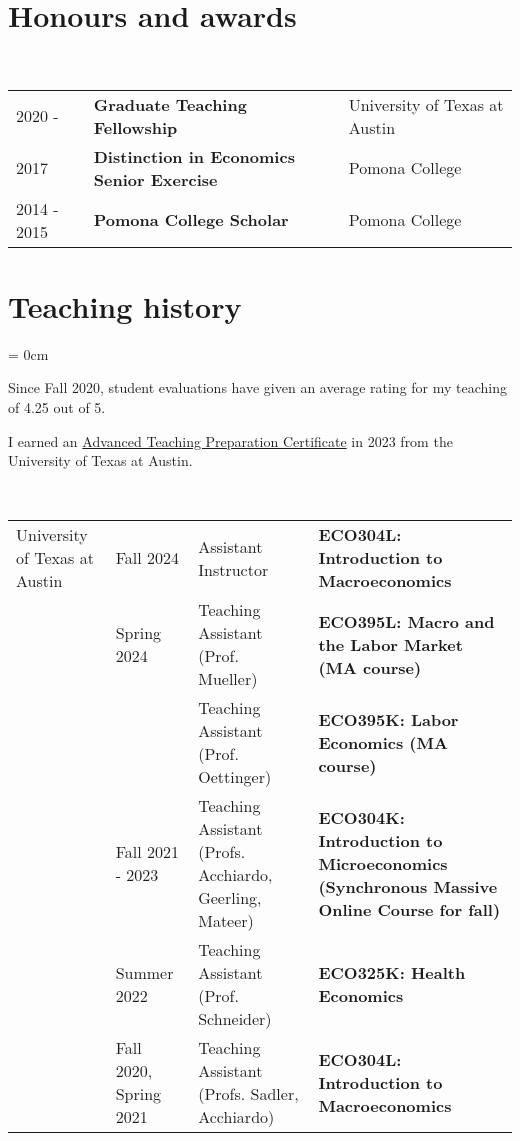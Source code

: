 \documentclass[a4paper, 10pt]{article}
\begin{document}
  \section{Honours and awards}
  ~\begin{tabular}{lll}
    2020 - & \textbf{Graduate Teaching Fellowship} & University of Texas at Austin\\
    2017 & \textbf{Distinction in Economics Senior Exercise} & Pomona College\\
    2014 - 2015 & \textbf{Pomona College Scholar} & Pomona College
  \end{tabular}
  \vspace*{0.25em}

  \section{Teaching history}\label{sec:teaching_history}
  \begin{compactitem}\parskip = 0cm
    \item Since Fall 2020, student evaluations have given an average rating for my teaching of 4.25 out of 5.
    \item I earned an \href{https://ctl.utexas.edu/teaching-preparation-series}{Advanced Teaching Preparation Certificate} in 2023 from the University of Texas at Austin.
  \end{compactitem}
  \vspace*{0.70em}
  ~\begin{tabular}{p{2.3cm} p{2.5cm} p{3.2cm} p{6.6cm}}
    University of \newline Texas at Austin & Fall 2024 & Assistant Instructor & \textbf{ECO304L: Introduction to \newline Macroeconomics}\\
    & Spring 2024 & Teaching Assistant \newline (Prof. Mueller) & \textbf{ECO395L: Macro and the Labor Market \newline (MA course)}\\
    & & Teaching Assistant \newline (Prof. Oettinger) & \textbf{ECO395K: Labor Economics (MA course)}\\
    & Fall 2021 - 2023 & Teaching Assistant \newline (Profs. Acchiardo, \newline Geerling, Mateer) & \textbf{ECO304K: Introduction to Microeconomics \newline (Synchronous Massive Online Course for \newline fall)}\\
    & Summer 2022 & Teaching Assistant \newline (Prof. Schneider) & \textbf{ECO325K: Health Economics}\\
    & Fall 2020, \newline Spring 2021 & Teaching Assistant \newline (Profs. Sadler, \newline Acchiardo) & \textbf{ECO304L: Introduction to \newline Macroeconomics}
  \end{tabular}
  \vspace*{0.25em}
\end{document}
